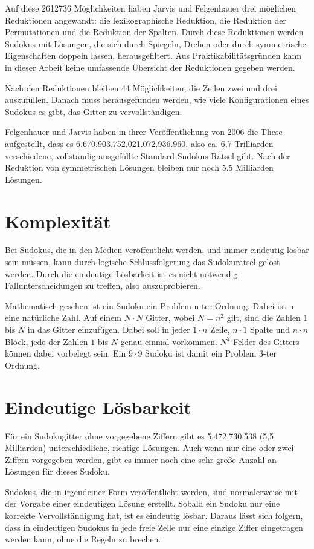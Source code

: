 Auf diese 2612736 Möglichkeiten haben Jarvis und Felgenhauer drei möglichen Reduktionen angewandt: die lexikographische Reduktion, die Reduktion der Permutationen und die Reduktion der Spalten. Durch diese Reduktionen werden Sudokus mit Lösungen, die sich durch Spiegeln, Drehen oder durch symmetrische Eigenschaften doppeln lassen, herausgefiltert. Aus Praktikabilitätsgründen kann in dieser Arbeit keine umfassende Übersicht der Reduktionen gegeben werden.

Nach den Reduktionen bleiben 44 Möglichkeiten, die Zeilen zwei und drei auszufüllen. Danach muss herausgefunden werden, wie viele Konfigurationen eines Sudokus es gibt, das Gitter zu vervollständigen. 

Felgenhauer und Jarvis haben in ihrer Veröffentlichung von 2006 die These aufgestellt, dass es 6.670.903.752.021.072.936.960, also ca. 6,7 Trilliarden  verschiedene, vollständig ausgefüllte Standard-Sudokus Rätsel gibt. Nach der Reduktion von symmetrischen Lösungen bleiben nur noch 5.5 Milliarden Lösungen. \cite{FelgenhauerJarvis}

\section{Komplexität}
Bei Sudokus, die in den Medien veröffentlicht werden, und immer eindeutig lösbar sein müssen, kann durch logische Schlussfolgerung das Sudokurätsel gelöst werden. Durch die eindeutige Lösbarkeit ist es nicht notwendig Fallunterscheidungen zu treffen, also auszuprobieren.

Mathematisch gesehen ist ein Sudoku ein Problem n-ter Ordnung. Dabei ist n eine natürliche Zahl. Auf einem $N\cdot N$ Gitter, wobei $N=n^2$ gilt, sind die Zahlen $1$ bis $N$ in das Gitter einzufügen. Dabei soll in jeder $1\cdot n$ Zeile, $n\cdot 1$ Spalte und $n\cdot n$ Block, jede der Zahlen $1$ bis $N$ genau einmal vorkommen. $N^2$ Felder des Gitters können dabei vorbelegt sein. Ein $9\cdot9$ Sudoku ist damit ein Problem 3-ter Ordnung.

\section{Eindeutige Lösbarkeit}
Für ein Sudokugitter ohne vorgegebene Ziffern gibt es 5.472.730.538 (5,5 Milliarden) unterschiedliche, richtige Lösungen. Auch wenn nur eine oder zwei Ziffern vorgegeben werden, gibt es immer noch eine sehr große Anzahl an Lösungen für dieses Sudoku. 

Sudokus, die in irgendeiner Form veröffentlicht werden, sind normalerweise mit der Vorgabe einer eindeutigen Lösung erstellt. Sobald ein Sudoku nur eine korrekte Vervollständigung hat, ist es eindeutig lösbar. Daraus lässt sich folgern, dass in eindeutigen Sudokus in jede freie Zelle nur eine einzige Ziffer eingetragen werden kann, ohne die Regeln zu brechen.

